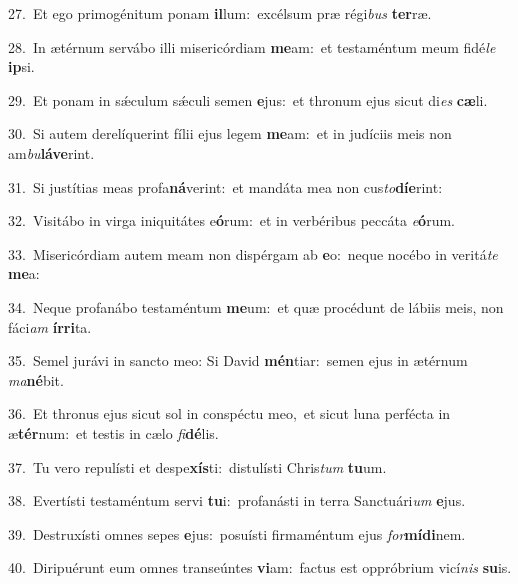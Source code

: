 {\numbfont\textcolor{\numbcolor}{27.}}~Et ego primogénitum ponam \textbf{il}\-lum:~\star excélsum præ régi\textit{bus} \textbf{ter}\-ræ.\par
{\numbfont\textcolor{\numbcolor}{28.}}~In ætérnum servábo illi misericórdiam \textbf{me}\-am:~\star et testaméntum meum fidé\textit{le} \textbf{ip}\-si.\par
{\numbfont\textcolor{\numbcolor}{29.}}~Et ponam in sǽculum sǽculi semen \textbf{e}\-jus:~\star et thronum ejus sicut di\textit{es} \textbf{cæ}\-li.\par
{\numbfont\textcolor{\numbcolor}{30.}}~Si autem derelíquerint fílii ejus legem \textbf{me}\-am:~\star et in judíciis meis non am\-\textit{bu}\-\textbf{lá}\textbf{ve}rint.\par
{\numbfont\textcolor{\numbcolor}{31.}}~Si justítias meas profa\-\textbf{ná}\-verint:~\star et mandáta mea non cus\-\textit{to}\-\textbf{dí}\textbf{e}rint:\par
{\numbfont\textcolor{\numbcolor}{32.}}~Visitábo in virga iniquitátes e\-\textbf{ó}\-rum:~\star et in verbéribus peccáta \textit{e}\-\textbf{ó}rum.\par
{\numbfont\textcolor{\numbcolor}{33.}}~Misericórdiam autem meam non dispérgam ab \textbf{e}\-o:~\star neque nocébo in veritá\textit{te} \textbf{me}\-a:\par
{\numbfont\textcolor{\numbcolor}{34.}}~Neque profanábo testaméntum \textbf{me}\-um:~\star et quæ procédunt de lábiis meis, non fáci\textit{am} \textbf{ír}\-\textbf{ri}ta.\par
{\numbfont\textcolor{\numbcolor}{35.}}~Semel jurávi in sancto meo: Si David \textbf{mén}\-tiar:~\star semen ejus in ætérnum \textit{ma}\-\textbf{né}bit.\par
{\numbfont\textcolor{\numbcolor}{36.}}~Et thronus ejus sicut sol in conspéctu meo,~\dagger et sicut luna perfécta in æ\-\textbf{tér}\-num:~\star et testis in cælo \textit{fi}\-\textbf{dé}lis.\par
{\numbfont\textcolor{\numbcolor}{37.}}~Tu vero repulísti et despe\-\textbf{xís}\-ti:~\star distulísti Chris\textit{tum} \textbf{tu}\-um.\par
{\numbfont\textcolor{\numbcolor}{38.}}~Evertísti testaméntum servi \textbf{tu}\-i:~\star profanásti in terra Sanctuári\textit{um} \textbf{e}\-jus.\par
{\numbfont\textcolor{\numbcolor}{39.}}~Destruxísti omnes sepes \textbf{e}\-jus:~\star posuísti firmaméntum ejus \textit{for}\-\textbf{mí}\textbf{di}nem.\par
{\numbfont\textcolor{\numbcolor}{40.}}~Diripuérunt eum omnes transeúntes \textbf{vi}\-am:~\star factus est oppróbrium vicí\textit{nis} \textbf{su}\-is.\par
